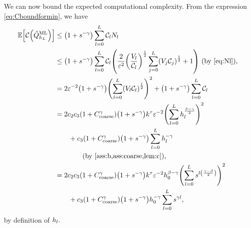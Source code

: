 We can now bound the expected computational complexity. From the expression \cref{eq:Cboundformin}, we have
\begin{align}
\EXP{\Cost{\QhatMLhL}} &\leq \mleft(1+s^{-\gamma}\mright)\sum_{l=0}^{L} \Cl \Nl\nonumber\\
&\leq \mleft(1+s^{-\gamma}\mright)\sum_{l=0}^L \Cl \mleft(\frac2{\eps^{2}} \mleft(\frac{\Vl}{\Cl}\mright)^{\half}\sum_{j=0}^L \mleft(\Vj\Costj\mright)^{\half} + 1\mright) \text{ (by \eqref{eq:Nl}),}\nonumber\\
&= 2\eps^{-2}\mleft(1+s^{-\gamma}\mright)\mleft(\sum_{l=0}^L\mleft(\Vl\Cl\mright)^{\half}\mright)^2 + \mleft(1+s^{-\gamma}\mright)\sum_{l=0}^L \Cl\nonumber\\
&= 2 \ct \cth \mleft(1+\Ccoarse^{\gamma}\mright)\mleft(1+s^{-\gamma}\mright)k^{\tau}\eps^{-2} \mleft(\sum_{l=0}^L \hl^{\frac{\beta-\gamma}2}\mright)^2\nonumber\\
&\quad\quad+ \cth  \mleft(1+\Ccoarse^{\gamma}\mright)\mleft(1+s^{-\gamma}\mright) \sum_{l=0}^L \hl^{-\gamma}\nonumber\\
&\quad\quad\quad\quad\text{(by \cref{ass:b,ass:coarse,lem:c}),}\nonumber\\
&= 2 \ct\cth \mleft(1+\Ccoarse^{\gamma}\mright) \mleft(1+s^{-\gamma}\mright)k^{\tau}\eps^{-2}\hz^{\beta-\gamma}\mleft(\sum_{l=0}^L s^{l\mleft(\frac{\gamma-\beta}2\mright)}\mright)^2\nonumber\\
&\quad\quad+ \cth \mleft(1+\Ccoarse^{\gamma}\mright)\mleft(1+s^{-\gamma}\mright) \hz^{-\gamma} \sum_{l=0}^L s^{\gamma l},\label{eq:complexitymidway}
\end{align}
by definition of $h_{l}.$

